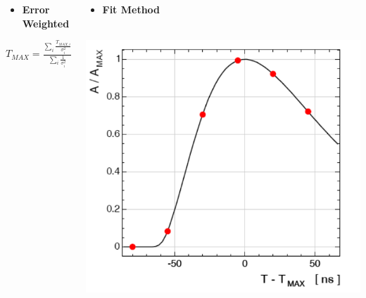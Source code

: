 \documentclass{beamer}
\begin{document}
\begin{frame}
\begin{minipage}[t]{\linewidth}
\end{minipage}
\vspace{-0.1cm} 
\begin{minipage}[b]{\textwidth}
    \begin{tcolorbox}[colback=UNL@Cream!5,colframe=UNL@Cream!70,title=\textcolor{UMN@Maroon}{\textbf{Time Measurement}}]    
  \begin{columns}
    \begin{column}{0.37\textwidth} 
      \begin{itemize}
       \item{ \color{UMN@Maroon} \textbf{Error Weighted}}\\ 
       \end{itemize}
        $ T_{MAX} = \frac{{\displaystyle\sum_{i}} \frac{T_{MAX,i} }{\sigma_i^2} }{ {\displaystyle\sum_{i}} \frac{1}{\sigma_i^2} } $ \\
        \end{column}
        \begin{column}{0.36\textwidth}
         \begin{itemize}     
           \item{ \color{UMN@Maroon} \textbf{Fit Method}}
        \end{itemize}
         \mbox{
         \includegraphics[height=0.58\textwidth, width=0.45\linewidth]{THESISPLOTS/AmplitudeVsTMax.png} 
}
\end{column}
\end{columns}
\end{tcolorbox}
\end{minipage}
\end{frame}
\end{document}
